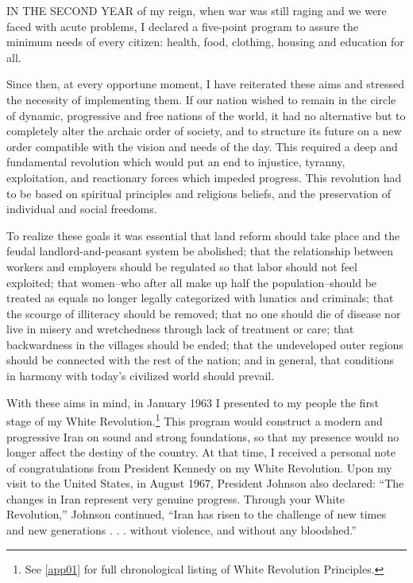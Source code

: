 IN THE SECOND YEAR of my reign, when war was still raging and we were faced with acute problems, I declared a five-point program to assure the minimum needs of every citizen: health, food, clothing, housing and education for all. 

Since then, at every opportune moment, I have reiterated these aims and stressed the necessity of implementing them. If our nation wished to remain in the circle of dynamic, progressive and free nations of the world, it had no alternative but to completely alter the archaic order of society, and to structure its future on a new order compatible with the vision and needs of the day. This required a deep and fundamental revolution which would put an end to injustice, tyranny, exploitation, and reactionary forces which impeded progress. This revolution had to be based on spiritual principles and religious beliefs, and the preservation of individual and social freedoms. 

To realize these goals it was essential that land reform should take place and the feudal landlord-and-peasant system be abolished; that the relationship between workers and employers should be regulated so that labor should not feel exploited; that women--who after all make up half the population--should be treated as equals no longer legally categorized with lunatics and criminals; that the scourge of illiteracy should be removed; that no one should die of disease nor live in misery and wretchedness through lack of treatment or care; that backwardness in the villages should be ended; that the undeveloped outer regions should be connected with the rest of the nation; and in general, that conditions in harmony with today’s civilized world should prevail. 

With these aims in mind, in January 1963 I presented to my people the first stage of my White Revolution.\footnote{See \cref{app01} for full chronological listing of White Revolution Principles.} This program would construct a modern and progressive Iran on sound and strong foundations, so that my presence would no longer affect the destiny of the country. At that time, I received a personal note of congratulations from President Kennedy on my White Revolution. Upon my visit to the United States, in August 1967, President Johnson also declared: “The changes in Iran represent very genuine progress. Through your White Revolution,” Johnson continued, “Iran has risen to the challenge of new times and new generations . . . without violence, and without any bloodshed.” 

